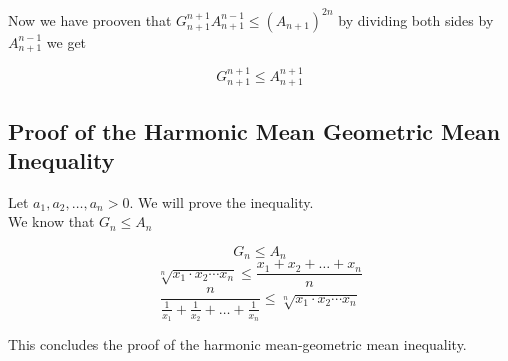 Now we have prooven that \(G_{n + 1}^{n + 1} A_{n + 1}^{n - 1}\leq \left(A_{n + 1}\right)^{2n}\) by dividing both sides by \( A_{n + 1}^{n - 1} \) we get
\begin{center}
	\[
		G_{n + 1}^{n + 1}\leq A_{n + 1}^{n + 1}
	\]
\end{center}
\QED

\subsection{Proof of the Harmonic Mean Geometric Mean Inequality}
Let \( a_1, a_2, \ldots, a_n > 0 \). We will prove the inequality.
\\
We know that \(G_n \leq A_n \)

\begin{center}
	\[
		G_n \leq A_n
	\]
	\[
		\sqrt[n]{x_1 \cdot x_2 \cdots x_n} \leq \frac{x_1 + x_2 + \ldots + x_n}{n}
	\]
	\[
		\frac{n}{\frac{1}{x_1} + \frac{1}{x_2} + \ldots + \frac{1}{x_n}} \leq \sqrt[n]{x_1 \cdot x_2 \cdots x_n}
	\]
\end{center}
This concludes the proof of the harmonic mean-geometric mean inequality.\\
\QED
\newpage
